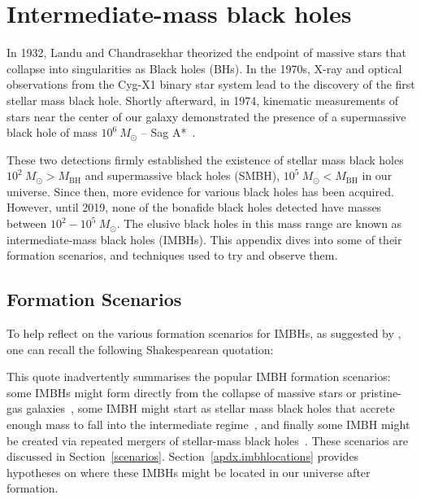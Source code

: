 \chapter{Intermediate-mass black holes}\label{apdx.imbh}

In 1932, Landu and Chandrasekhar theorized the endpoint of massive
stars that collapse into singularities as Black holes (BHs). 
In the 1970s, X-ray and optical observations from the Cyg-X1 binary star system lead to the discovery of the first stellar mass black hole. 
Shortly afterward, in 1974, kinematic measurements of stars near the center of our galaxy demonstrated the presence of a supermassive black hole of mass $10^6\ M_{\odot}$ -- Sag A*~\cite{sagA}.

These two detections firmly established the existence of stellar mass black holes $10^{2} \ M_{\odot} > M_\text{BH}$ and supermassive black holes (SMBH), $10^{5} \ M_{\odot} < M_\text{BH}$ in our universe. 
Since then, more evidence for various black holes has been acquired. 
However, until 2019, none of the bonafide black holes detected have masses between $10^{2} - 10^{5}\ M_{\odot}$. 
The elusive black holes in this mass range are known as intermediate-mass black holes (IMBHs).
This appendix dives into some of their formation scenarios, and techniques used to try and observe them.  


\section{Formation Scenarios}

To help reflect on the various formation scenarios for IMBHs,  
as suggested by \citet{miller2003formation},
one can recall the following Shakespearean quotation:



This quote inadvertently summarises the popular IMBH formation scenarios: some IMBHs might form directly from the collapse of massive stars or pristine-gas galaxies~\cite{lodato2006supermassive}, some IMBH might start as stellar mass black holes that accrete enough mass to fall into the intermediate regime~\cite{coleman2002production}, and finally some IMBH might be created via repeated mergers of stellar-mass black holes~\cite{2018IMBHreview}. 
These scenarios are discussed in Section~\ref{scenarios}. 
Section~\ref{apdx.imbhlocations} provides hypotheses on where these IMBHs might be located in our universe after formation.

